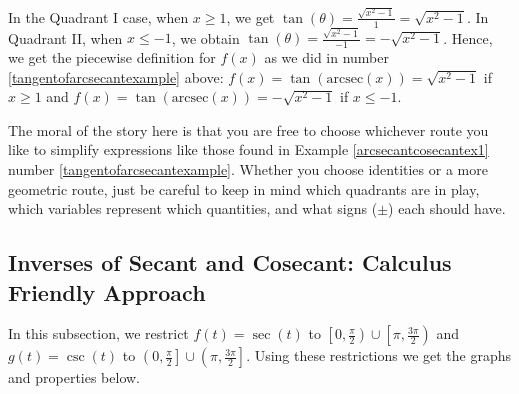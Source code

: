\documentclass{ximera}
\begin{document}
\smallskip

In the Quadrant I case, when $x \geq 1$, we get $\tan(\theta)  = \frac{\sqrt{x^2-1}}{1} = \sqrt{x^2-1}$.  In Quadrant II, when $x \leq -1$, we obtain  $\tan(\theta)  = \frac{\sqrt{x^2-1}}{-1} = - \sqrt{x^2-1}$.   Hence, we get the piecewise definition for $f(x)$ as we did in number \ref{tangentofarcsecantexample} above:  $f(x)  = \tan(\mbox{arcsec}(x)) = \sqrt{x^2-1}$ if $x \geq 1$ and $f(x)  = \tan(\mbox{arcsec}(x)) = -\sqrt{x^2-1}$ if $x \leq -1$.

\smallskip

The moral of the story here is that you are free to choose whichever route you like to simplify expressions like those found in Example \ref{arcsecantcosecantex1} number \ref{tangentofarcsecantexample}.  Whether you choose identities or a more geometric route, just be careful to keep in mind which quadrants are in play, which variables represent which quantities, and what signs ($\pm$) each should have.


\subsection{Inverses of Secant and Cosecant: Calculus Friendly Approach}
\label{arcsecantcalcfriendly}

In this subsection, we restrict $f(t) = \sec(t)$ to $\left[0, \frac{\pi}{2}\right) \cup \left[\pi, \frac{3\pi}{2}\right)$  and  $g(t) = \csc(t)$ to $\left(0, \frac{\pi}{2}\right] \cup \left( \pi, \frac{3\pi}{2}\right]$.  Using these restrictions we get the graphs and properties below.
\end{document}
